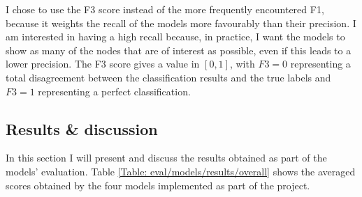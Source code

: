 		I chose to use the F3 score instead of the more frequently encountered F1, because it weights the recall of the models more favourably than their precision. I am interested in having a high recall because, in practice, I want the models to show as many of the nodes that are of interest as possible, even if this leads to a lower precision. The F3 score gives a value in $[0, 1]$, with $F3 = 0$ representing a total disagreement between the classification results and the true labels and $F3 = 1$ representing a perfect classification.
		
		\subsection{Results \& discussion} \label{Section: eval/ml/results}
		In this section I will present and discuss the results obtained as part of the models' evaluation. Table \ref{Table: eval/models/results/overall} shows the averaged scores obtained by the four models implemented as part of the project. 
		
